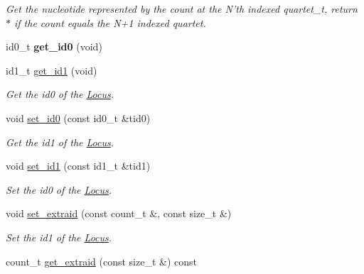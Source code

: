 \begin{DoxyCompactItemize}
\begin{DoxyCompactList}\small\item\em Get the nucleotide represented by the count at the N'th indexed quartet\-\_\-t, return $\ast$ if the count equals the N+1 indexed quartet. \end{DoxyCompactList}\item 
\hypertarget{classLocus_a3803ff2a28d2ddb138ef827e9b7b115a}{id0\-\_\-t {\bfseries get\-\_\-id0} (void)}\label{classLocus_a3803ff2a28d2ddb138ef827e9b7b115a}

\item 
\hypertarget{classLocus_a9f4e7ba54f0178fa6889e70cb8093a33}{id1\-\_\-t \hyperlink{classLocus_a9f4e7ba54f0178fa6889e70cb8093a33}{get\-\_\-id1} (void)}\label{classLocus_a9f4e7ba54f0178fa6889e70cb8093a33}

\begin{DoxyCompactList}\small\item\em Get the id0 of the \hyperlink{classLocus}{Locus}. \end{DoxyCompactList}\item 
\hypertarget{classLocus_a2cf45eae6ce44630cc1a28016dd6566c}{void \hyperlink{classLocus_a2cf45eae6ce44630cc1a28016dd6566c}{set\-\_\-id0} (const id0\-\_\-t \&tid0)}\label{classLocus_a2cf45eae6ce44630cc1a28016dd6566c}

\begin{DoxyCompactList}\small\item\em Get the id1 of the \hyperlink{classLocus}{Locus}. \end{DoxyCompactList}\item 
\hypertarget{classLocus_a66609fcd5c7850ede53c9d6283b74473}{void \hyperlink{classLocus_a66609fcd5c7850ede53c9d6283b74473}{set\-\_\-id1} (const id1\-\_\-t \&tid1)}\label{classLocus_a66609fcd5c7850ede53c9d6283b74473}

\begin{DoxyCompactList}\small\item\em Set the id0 of the \hyperlink{classLocus}{Locus}. \end{DoxyCompactList}\item 
void \hyperlink{classLocus_af133c8681c65ed62502519dfa87f0ff0}{set\-\_\-extraid} (const count\-\_\-t \&, const size\-\_\-t \&)
\begin{DoxyCompactList}\small\item\em Set the id1 of the \hyperlink{classLocus}{Locus}. \end{DoxyCompactList}\item 
\hypertarget{classLocus_a1c4d5b147496126ee1dbf5d74b04fa15}{count\-\_\-t \hyperlink{classLocus_a1c4d5b147496126ee1dbf5d74b04fa15}{get\-\_\-extraid} (const size\-\_\-t \&) const }\label{classLocus_a1c4d5b147496126ee1dbf5d74b04fa15}


\end{DoxyCompactItemize}
